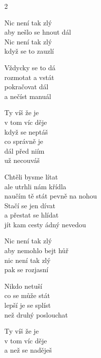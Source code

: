 \begin{multicols}{2}
   
\ve{} 
Nic není tak zlý\\
aby nešlo se hnout dál\\
Nic není tak zlý\\
když se to zauzlí
 
\ve{}
Vždycky se to dá\\
rozmotat a vstát\\
pokračovat dál\\
a nečíst manuál

Ty víš že je\\
v tom víc děje\\
když se neptáš\\
co správně je\\
dál před niím\\
už necouváš
 
\cho{}
Chtěli bysme lítat\\
ale utrhli nám křídla\\
naučím tě stát pevně na nohou\\
Stačí se jen dívat\\
a přestat se hlídat\\
jít kam cesty ádný nevedou

\columnbreak
\ve{}
Nic není tak zlý\\
aby nemohlo bejt hůř\\
nic není tak zlý\\
pak se rozjasní
 
\ve{}
Nikdo netuší\\
co se může stát\\
lepší je se splíst\\
než druhý poslouchat
 

\cho{}

Ty víš že je\\
v tom víc děje\\
a než se naděješ
 
\cho{}
~

\end{multicols}

\esong{}